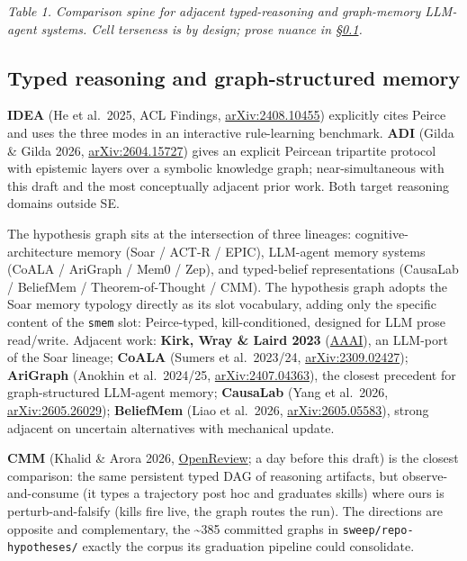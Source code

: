 \documentclass[
  10pt,
]{article}
\begin{document}
\emph{Table 1. Comparison spine for adjacent typed-reasoning and
graph-memory LLM-agent systems. Cell terseness is by design; prose
nuance in \S\ref{typed-memory}.}

\subsection{Typed reasoning and graph-structured
memory}\label{typed-memory}

\textbf{IDEA} (He et al.~2025, ACL Findings,
\href{https://arxiv.org/abs/2408.10455}{arXiv:2408.10455}) explicitly
cites Peirce and uses the three modes in an interactive rule-learning
benchmark. \textbf{ADI} (Gilda \& Gilda 2026,
\href{https://arxiv.org/abs/2604.15727}{arXiv:2604.15727}) gives an
explicit Peircean tripartite protocol with epistemic layers over a
symbolic knowledge graph; near-simultaneous with this draft and the most
conceptually adjacent prior work. Both target reasoning domains outside
SE.

The hypothesis graph sits at the intersection of three lineages:
cognitive-architecture memory (Soar / ACT-R / EPIC), LLM-agent memory
systems (CoALA / AriGraph / Mem0 / Zep), and typed-belief
representations (CausaLab / BeliefMem / Theorem-of-Thought / CMM). The
hypothesis graph adopts the Soar memory typology directly as its slot
vocabulary, adding only the specific content of the \texttt{smem} slot:
Peirce-typed, kill-conditioned, designed for LLM prose read/write.
Adjacent work: \textbf{Kirk, Wray \& Laird 2023}
(\href{https://ojs.aaai.org/index.php/AAAI-SS/article/download/27690/27463/31741}{AAAI}),
an LLM-port of the Soar lineage; \textbf{CoALA} (Sumers et al.~2023/24,
\href{https://arxiv.org/abs/2309.02427}{arXiv:2309.02427});
\textbf{AriGraph} (Anokhin et al.~2024/25,
\href{https://arxiv.org/abs/2407.04363}{arXiv:2407.04363}), the closest
precedent for graph-structured LLM-agent memory; \textbf{CausaLab} (Yang
et al.~2026, \href{https://arxiv.org/abs/2605.26029}{arXiv:2605.26029});
\textbf{BeliefMem} (Liao et al.~2026,
\href{https://arxiv.org/abs/2605.05583}{arXiv:2605.05583}), strong
adjacent on uncertain alternatives with mechanical update.

\textbf{CMM} (Khalid \& Arora 2026,
\href{https://openreview.net/pdf?id=yCsHQnvvWY}{OpenReview}; a day
before this draft) is the closest comparison: the same persistent typed
DAG of reasoning artifacts, but observe-and-consume (it types a
trajectory post hoc and graduates skills) where ours is
perturb-and-falsify (kills fire live, the graph routes the run). The
directions are opposite and complementary, the \textasciitilde385
committed graphs in \texttt{sweep/repo-hypotheses/} exactly the corpus
its graduation pipeline could consolidate.
\end{document}
